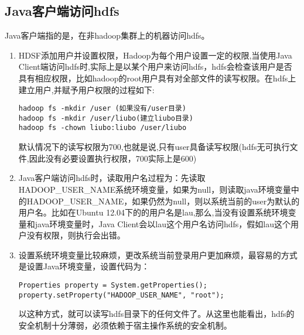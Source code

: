 \subsection{Java客户端访问hdfs}
\par Java客户端指的是，在非hadoop集群上的机器访问hdfs。
\begin{enumerate}[(1)]
\item HDSF添加用户并设置权限，Hadoop为每个用户设置一定的权限,当使用Java Client端访问hdfs时,实际上是以某个用户来访问hdfs，hdfs会检查该用户是否具有相应权限，比如hadoop的root用户具有对全部文件的读写权限。在hdfs上建立用户,并赋予用户权限的过程如下:
\begin{verbatim}
hadoop fs -mkdir /user (如果没有/user目录)
hadoop fs -mkdir /user/liubo(建立liubo目录)
hadoop fs -chown liubo:liubo /user/liubo
\end{verbatim}
\par 默认情况下的读写权限为700,也就是说,只有user具备读写权限(hdfs无可执行文件,因此没有必要设置执行权限，700实际上是600)
\item Java客户端访问hdfs时，读取用户名过程为：先读取HADOOP\_USER\_NAME系统环境变量，如果为null，则读取java环境变量中的HADOOP\_USER\_NAME，如果仍然为null，则以系统当前的user为默认的用户名。比如在Ubuntu 12.04下的的用户名是lau,那么,当没有设置系统环境变量和java环境变量时，Java Client会以lau这个用户名访问hdfs，假如lau这个用户没有权限，则执行会出错。
\item 设置系统环境变量比较麻烦，更改系统当前登录用户更加麻烦，最容易的方式是设置Java环境变量，设置代码为：
\begin{verbatim}
Properties property = System.getProperties();
property.setProperty("HADOOP_USER_NAME", "root");
\end{verbatim}
\par 以这种方式，就可以读写hdfs目录下的任何文件了。从这里也能看出，hdfs的安全机制十分薄弱，必须依赖于宿主操作系统的安全机制。
\end{enumerate}